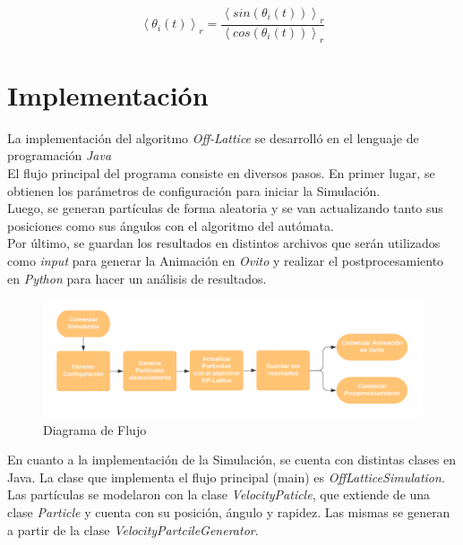 \documentclass[12pt, a4paper]{report}
\begin{document}
\begin{equation}
\label{eq:avgangle}
\left\langle \theta _i(t)\right\rangle _r =  \frac{\left\langle sin(\theta _i(t))\right\rangle _r}{\left\langle cos(\theta _i(t))\right\rangle _r} 
\end{equation}

\section{Implementación}
La implementación del algoritmo \emph{Off-Lattice} se desarrolló en el lenguaje de programación \emph{Java}\\

El flujo principal del programa consiste en diversos pasos. En primer lugar, se obtienen los parámetros de configuración para iniciar la Simulación.\\

Luego, se generan partículas de forma aleatoria y se van actualizando tanto sus posiciones como sus ángulos con el algoritmo del autómata. \\

Por último, se guardan los resultados en distintos archivos que serán utilizados como \emph{input} para generar la Animación en \emph{Ovito} y realizar el postprocesamiento en \emph{Python} para hacer un análisis de resultados.\\

\begin{figure}[h]
\includegraphics[scale=0.35]{Diagrama de flujo.png}
\centering 
\caption{Diagrama de Flujo}
\end{figure}

En cuanto a la implementación de la Simulación, se cuenta con distintas clases en Java. La clase que implementa el flujo principal (main) es \emph{OffLatticeSimulation}. Las partículas se modelaron con la clase \emph{VelocityPaticle}, que extiende de una clase \emph{Particle} y cuenta con su posición, ángulo y rapidez. Las mismas se generan a partir de la clase \emph{VelocityPartcileGenerator}.\\
\end{document}
